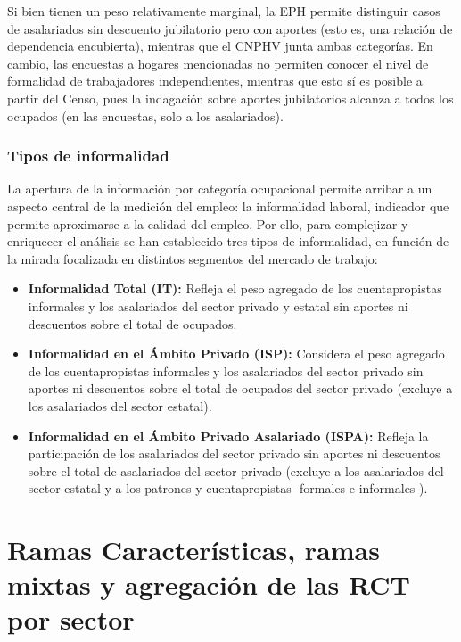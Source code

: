 \documentclass[
  openany]{book}
\begin{document}
Si bien tienen un peso relativamente marginal, la EPH permite distinguir casos de asalariados sin descuento jubilatorio pero con aportes (esto es, una relación de dependencia encubierta), mientras que el CNPHV junta ambas categorías.
En cambio, las encuestas a hogares mencionadas no permiten conocer el nivel de formalidad de trabajadores independientes, mientras que esto sí es posible a partir del Censo, pues la indagación sobre aportes jubilatorios alcanza a todos los ocupados (en las encuestas, solo a los asalariados).

\hypertarget{tipos-de-informalidad}{%
\subsubsection{Tipos de informalidad}\label{tipos-de-informalidad}}

La apertura de la información por categoría ocupacional permite arribar a un aspecto central de la medición del empleo: la informalidad laboral, indicador que permite aproximarse a la calidad del empleo.
Por ello, para complejizar y enriquecer el análisis se han establecido tres tipos de informalidad, en función de la mirada focalizada en distintos segmentos del mercado de trabajo:

\begin{itemize}
\item
  \textbf{Informalidad Total (IT):} Refleja el peso agregado de los cuentapropistas informales y los asalariados del sector privado y estatal sin aportes ni descuentos sobre el total de ocupados.
\item
  \textbf{Informalidad en el Ámbito Privado (ISP):} Considera el peso agregado de los cuentapropistas informales y los asalariados del sector privado sin aportes ni descuentos sobre el total de ocupados del sector privado (excluye a los asalariados del sector estatal).
\item
  \textbf{Informalidad en el Ámbito Privado Asalariado (ISPA):} Refleja la participación de los asalariados del sector privado sin aportes ni descuentos sobre el total de asalariados del sector privado (excluye a los asalariados del sector estatal y a los patrones y cuentapropistas -formales e informales-).
\end{itemize}

\hypertarget{ramas-caracteruxedsticas-ramas-mixtas-y-agregaciuxf3n-de-las-rct-por-sector}{%
\section{Ramas Características, ramas mixtas y agregación de las RCT por sector}\label{ramas-caracteruxedsticas-ramas-mixtas-y-agregaciuxf3n-de-las-rct-por-sector}}
\end{document}
